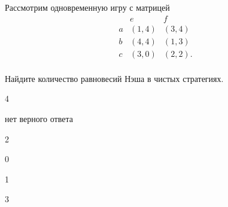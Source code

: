 
\begin{question}
Рассмотрим одновременную игру с матрицей \[
\begin{matrix}
   & e & f \\
a  & (1, 4) & (3, 4) \\
b  & (4, 4) & (1, 3) \\
c  & (3, 0)          & (2, 2). \\
\end{matrix}
\]

Найдите количество равновесий Нэша в чистых стратегиях.
\begin{answerlist}
  \item 4
  \item нет верного ответа
  \item 2
  \item 0
  \item 1
  \item 3
\end{answerlist}
\end{question}


